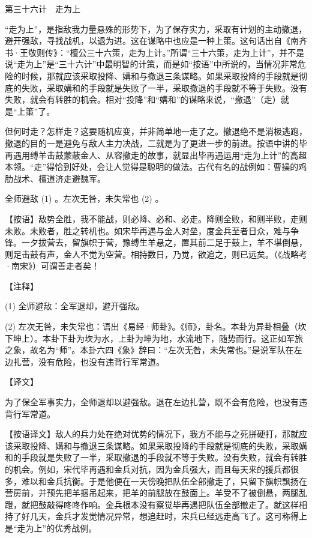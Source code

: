 \documentclass[12pt,UTF8]{ctexbook}
\begin{document}
第三十六计　走为上


“走为上”，是指敌我力量悬殊的形势下，为了保存实力，采取有计划的主动撤退，避开强敌，寻找战机，以退为进。这在谋略中也应是一种上策。这句话出自《南齐书·王敬则传》：“檀公三十六策，走为上计。”所谓“三十六策，走为上计”，并不是说“走为上”是“三十六计”中最明智的计策，而是如“按语”中所说的，当情况非常危险的时候，那就应该采取投降、媾和与撤退三条谋略。如果采取投降的手段就是彻底的失败，采取媾和的手段就是失败了一半，采取撤退的手段就不等于失败。没有失败，就会有转胜的机会。相对“投降”和“媾和”的谋略来说，“撤退”（走）就是“上策”了。

但何时走？怎样走？这要随机应变，并非简单地一走了之。撤退绝不是消极逃跑，撤退的目的一是避免与敌人主力决战，二就是为了更进一步的前进。按语中讲的毕再遇用缚羊击鼓蒙蔽金人、从容撤走的故事，就显出毕再遇运用“走为上计”的高超本领。“走”得恰到好处，会让人觉得是聪明的做法。古代有名的战例如：曹操的鸡肋战术、檀道济走避魏军。





全师避敌 (1) 。左次无咎，未失常也 (2) 。

【按语】敌势全胜，我不能战，则必降、必和、必走。降则全败，和则半败，走则未败。未败者，胜之转机也。如宋毕再遇与金人对垒，度金兵至者日众，难与争锋。一夕拔营去，留旗帜于营，豫缚生羊悬之，置其前二足于鼓上，羊不堪倒悬，则足击鼓有声，金人不觉为空营。相持数日，乃觉，欲追之，则已远矣。（《战略考·南宋》）可谓善走者矣！





【注释】


(1) 全师避敌：全军退却，避开强敌。

(2) 左次无咎，未失常也：语出《易经·师卦》。《师》，卦名。本卦为异卦相叠（坎下坤上）。本卦下卦为坎为水，上卦为坤为地，水流地下，随势而行。这正如军旅之象，故名为“师”。本卦六四《象》辞曰：“左次无咎，未失常也。”是说军队在左边扎营，没有危险，也没有违背行军常道。





【译文】


为了保全军事实力，全师退却以避强敌。退在左边扎营，既不会有危险，也没有违背行军常道。

【按语译文】敌人的兵力处在绝对优势的情况下，我方不能与之死拼硬打，那就应该采取投降、媾和与撤退三条谋略。如果采取投降的手段就是彻底的失败，采取媾和的手段就是失败了一半，采取撤退的手段就不等于失败。没有失败，就会有转胜的机会。例如，宋代毕再遇和金兵对抗，因为金兵强大，而且每天来的援兵都很多，难以和金兵抗衡。于是他便在一天傍晚把队伍全部撤走了，只留下旗帜飘扬在营房前，并预先把羊捆吊起来，把羊的前腿放在鼓面上。羊受不了被倒悬，两腿乱蹬，就把鼓敲得咚咚作响。金兵根本没有察觉毕再遇把队伍全部撤走了。就这样相持了好几天，金兵才发觉情况异常，想追赶时，宋兵已经远走高飞了。这可称得上是“走为上”的优秀战例。

\backmatter
\end{document}
